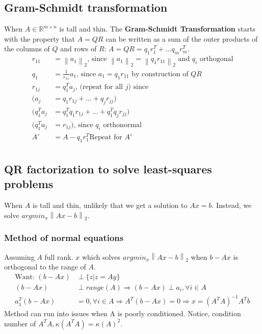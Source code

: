 \documentclass{article}
\newcommand{\norm}[2]{\left\lVert#1\right\rVert_#2}
\begin{document}
\begin{itemize}
{\subsection{Gram-Schmidt transformation}
When $A \in \mathbb{R}^{m\times n}$ is tall and thin. The \textbf{Gram-Schmidt Transformation} starts with the property that $A=QR$ can be written as a sum of the outer products of the columns of $Q$ and rows of $R$: $A = QR = q_1r_1^T + \dots q_mr_m^T$. 
\begin{align*}
    r_{11} &= \norm{a_1}{2} \textrm{, since } \norm{a_1}{2} = \norm{q_1r_{11}}{2} \textrm{ and $q_i$ orthogonal}\\
    q_1 &= \frac{1}{r_{11}}a_1\textrm{, since } a_1 = q_1r_{11} \textrm{ by construction of } QR \\
    r_{1j} &= q_1^Ta_j \textrm{, (repeat for all $j$) since }\\
    (a_j &= q_1r_{1j} + \dots + q_jr_{jj})\\
    (q_1^Ta_j &= q_1^Tq_1r_{1j} + \dots + q_1^Tq_jr_{jj})\\
    (q_1^Ta_j &= r_{1j}) \textrm{, since $q_i$ orthonormal}\\
    A' &= A - q_1r_1^T \textrm{Repeat for $A'$}\\
\end{align*}


\subsection{QR factorization to solve least-squares problems}
When $A$ is tall and thin, unlikely that we get a solution to $Ax = b$. Instead, we solve $argmin_x\norm{Ax - b}{2}$. 

\subsubsection{Method of normal equations}
Assuming $A$ full rank. $x$ which solves $argmin_x\norm{Ax - b}{2}$ when $b-Ax$ is orthogonal to the range of $A$.
\begin{align*}
    \textrm{Want: } (b-Ax) &\perp \{z \vert z = Ay\}\\
    (b-Ax) &\perp range(A) \Rightarrow (b-Ax) \perp a_i, \forall i \in A\\
    a_1^T(b-Ax) &= 0, \forall i \in A \Rightarrow A^T(b-Ax) = 0 \Rightarrow x = (A^TA)^{-1}A^Tb
\end{align*}
Method can run into issues when A is poorly conditioned. Notice, condition number of $A^TA, \kappa(A^TA) = \kappa(A)^2$. 

}
\end{itemize}
\end{document}
